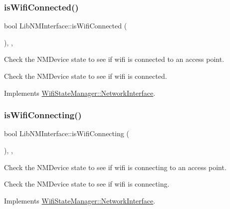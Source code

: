 \subsubsection{\texorpdfstring{is\+Wifi\+Connected()}{isWifiConnected()}}
{\footnotesize\ttfamily bool Lib\+N\+M\+Interface\+::is\+Wifi\+Connected (\begin{DoxyParamCaption}{ }\end{DoxyParamCaption})\hspace{0.3cm}{\ttfamily [override]}, {\ttfamily [protected]}, {\ttfamily [virtual]}}

Check the N\+M\+Device state to see if wifi is connected to an access point.

Check the N\+M\+Device state to see if wifi is connected. 

Implements \mbox{\hyperlink{classWifiStateManager_1_1NetworkInterface_a236b07174e3ab91973fce616746c0f70}{Wifi\+State\+Manager\+::\+Network\+Interface}}.

\mbox{\label{classLibNMInterface_a78c4b23cbf834a6352c5351b7aedb1c1}} 
\subsubsection{\texorpdfstring{is\+Wifi\+Connecting()}{isWifiConnecting()}}
{\footnotesize\ttfamily bool Lib\+N\+M\+Interface\+::is\+Wifi\+Connecting (\begin{DoxyParamCaption}{ }\end{DoxyParamCaption})\hspace{0.3cm}{\ttfamily [override]}, {\ttfamily [protected]}, {\ttfamily [virtual]}}

Check the N\+M\+Device state to see if wifi is connecting to an access point.

Check the N\+M\+Device state to see if wifi is connecting. 

Implements \mbox{\hyperlink{classWifiStateManager_1_1NetworkInterface_ade4c478d4b57628d39726f1b85a396f0}{Wifi\+State\+Manager\+::\+Network\+Interface}}.

\mbox{\label{classLibNMInterface_aded8fa727a07bfac38828815bf607c61}} 
